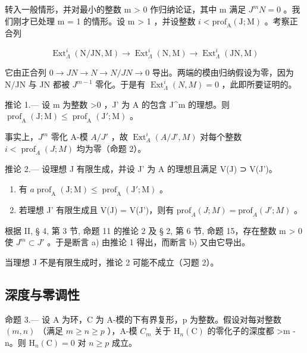 转入一般情形，并对最小的整数 m \textgreater{} 0 作归纳论证，其中 m 满足 \(J^{m}N = 0\) 。我们刚才已处理 m = 1 的情形。设 m \textgreater{} 1 ，并设整数 \(i < \text{prof}_{\text{A}}(\text{J}; \text{M})\) 。考察正合列

\[
\operatorname{Ext} _ {\Lambda} ^ {i} (\mathrm{N/JN,M}) \longrightarrow \operatorname{Ext} _ {\Lambda} ^ {i} (\mathrm{N,M}) \longrightarrow \operatorname{Ext} _ {\Lambda} ^ {i} (\mathrm{JN,M})
\]

它由正合列 \(0 \rightarrow JN \rightarrow N \rightarrow N/JN \rightarrow 0\) 导出。两端的模由归纳假设为零，因为 N/JN 与 JN 都被 \(J^{m-1}\) 零化。于是有 \(\operatorname{Ext}_{\Lambda}^{i}(N,M) = 0\) ，此即所要证明的。

推论 1.--- 设 m 为整数 \textgreater0 ，J' 为 A 的包含 J\^{}m 的理想。则 \(\operatorname{prof}_{\mathrm{A}}(\mathrm{J};\mathrm{M}) \leqslant \operatorname{prof}_{\mathrm{A}}(\mathrm{J}';\mathrm{M})\) 。

事实上，\(J^{m}\) 零化 A-模 \(A/J'\) ，故 \(\operatorname{Ext}_{A}^{i}(A/J', M)\) 对每个整数 \(i < \operatorname{prof}_{A}(J; M)\) 均为零（命题 2）。

推论 2.--- 设理想 J 有限生成，并设 J' 为 A 的理想且满足 V(J) ⊃ V(J')。

\begin{enumerate}
\def\labelenumi{\alph{enumi})}
\item
  有 \(a \operatorname{prof}_{\mathrm{A}}(\mathrm{J}; \mathrm{M}) \leqslant \operatorname{prof}_{\mathrm{A}}(\mathrm{J}'; \mathrm{M})\) 。
\item
  若理想 J' 有限生成且 V(J) = V(J')，则有 \(\text{prof}_{A}(J; M) = \text{prof}_{A}(J'; M)\) 。
\end{enumerate}

根据 II, § 4, 第 3 节, 命题 11 的推论 2 及 § 2, 第 6 节, 命题 15，存在整数 m \textgreater{} 0 使 \(J^{m} \subset J'\) 。于是断言 a) 由推论 1 得出，而断言 b) 又由它导出。

当理想 J 不是有限生成时，推论 2 可能不成立（习题 2）。

\subsection{深度与零调性}

命题 3.--- 设 A 为环，C 为 A-模的下有界复形，p 为整数。假设对每对整数 \((m,n)\) （满足 \(m \geqslant n \geqslant p\) ），A-模 \(C_{m}\) 关于 \(\mathrm{H}_{n}(\mathrm{C})\) 的零化子的深度都 \textgreater m - n。则 \(\mathrm{H}_{n}(\mathrm{C}) = 0\) 对 \(n \geqslant p\) 成立。

